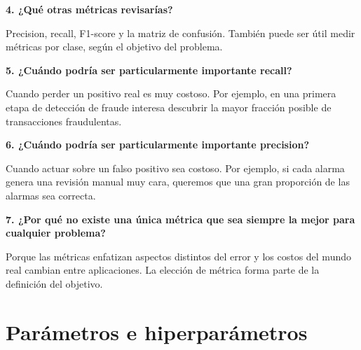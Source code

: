 \documentclass[11pt]{article}
\newcommand{\pregunta}[1]{\vspace{2mm}\textbf{#1}}
\begin{document}
\pregunta{4. ¿Qué otras métricas revisarías?}
\begin{respuesta}
Precision, recall, F1-score y la matriz de confusión. También puede ser útil medir métricas por clase, según el objetivo del problema.
\end{respuesta}

\pregunta{5. ¿Cuándo podría ser particularmente importante recall?}
\begin{respuesta}
Cuando perder un positivo real es muy costoso. Por ejemplo, en una primera etapa de detección de fraude interesa descubrir la mayor fracción posible de transacciones fraudulentas.
\end{respuesta}

\pregunta{6. ¿Cuándo podría ser particularmente importante precision?}
\begin{respuesta}
Cuando actuar sobre un falso positivo sea costoso. Por ejemplo, si cada alarma genera una revisión manual muy cara, queremos que una gran proporción de las alarmas sea correcta.
\end{respuesta}

\pregunta{7. ¿Por qué no existe una única métrica que sea siempre la mejor para cualquier problema?}
\begin{respuesta}
Porque las métricas enfatizan aspectos distintos del error y los costos del mundo real cambian entre aplicaciones. La elección de métrica forma parte de la definición del objetivo.
\end{respuesta}

\section{Parámetros e hiperparámetros}

\begin{center}
\end{center}
\end{document}
